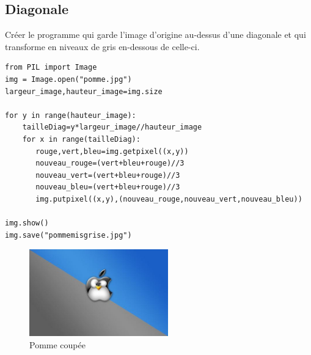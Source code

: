 \documentclass[11pt]{article}
\begin{document}
\subsection{Diagonale}
\label{sec:orgb3c5471}

Créer le programme qui garde l'image d'origine au-dessus d'une diagonale et qui transforme en niveaux de gris en-dessous de celle-ci.

\begin{verbatim}
from PIL import Image
img = Image.open("pomme.jpg")
largeur_image,hauteur_image=img.size

for y in range(hauteur_image):
    tailleDiag=y*largeur_image//hauteur_image
    for x in range(tailleDiag):
       rouge,vert,bleu=img.getpixel((x,y))
       nouveau_rouge=(vert+bleu+rouge)//3
       nouveau_vert=(vert+bleu+rouge)//3
       nouveau_bleu=(vert+bleu+rouge)//3
       img.putpixel((x,y),(nouveau_rouge,nouveau_vert,nouveau_bleu))

img.show()
img.save("pommemisgrise.jpg")
\end{verbatim}

\begin{figure}[htbp]
\centering
\includegraphics[width=6cm]{pommemisgrise.jpg}
\caption{Pomme coupée}
\end{figure}
\end{document}
